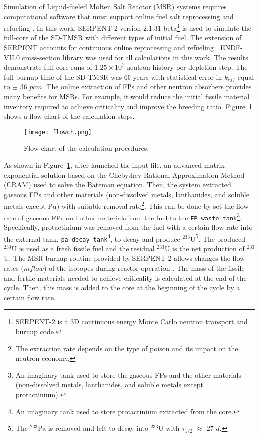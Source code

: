 Simulation of Liquid-fueled Molten Salt Reactor (MSR) systems requires 
computational software that must support online fuel salt reprocessing and 
refueling \cite{serp2014molten}. In this work, SERPENT-2 version 2.1.31 
beta\footnote{SERPENT-2 is a 3D continuous energy Monte Carlo neutron 
transport and burnup code.} \cite{leppanen2014serpent} is used to simulate the 
full-core of the SD-TMSR with different types of initial fuel. The extension 
of SERPENT accounts for continuous online reprocessing and refueling 
\cite{aufiero2013extended}. ENDF-VII.0 cross-section library was used for all 
calculations in this work. The results demonstrate full-core runs of 
$1.25\times 10^7$ neutron history per depletion step. The full burnup time of 
the SD-TMSR was 60 years with statistical error in $k_{eff}$ equal to $\pm$ 
$36$ $pcm$. The online extraction of \gls{FPs} and other neutron absorbers 
provides many benefits for MSRs. For example, it would reduce the initial 
fissile material inventory required to achieve criticality and improve the 
breeding ratio. Figure~\ref{fig:flow} shows a flow chart of the calculation 
steps. 

\begin{figure}[t!] %
	\texttt{[image: flowch.png]}
	\caption{Flow chart of the calculation procedures.}
	\label{fig:flow}
\end{figure}

As shown in Figure~\ref{fig:flow}, after launched the input file, an advanced 
matrix exponential solution based on the Chebyshev Rational Approximation 
Method (CRAM) \cite{isotalo2016improving} used to solve the Bateman equation. 
Then, the system extracted gaseous \gls{FPs} and other materials 
(non-dissolved metals, lanthanides, and soluble metals except Pu) with 
suitable removal rate\footnote{The extraction rate depends on the type of 
poison and its impact on the neutron
economy.}. This can be done by set the 
flow rate of gaseous \gls{FPs} and other materials from the fuel to the 
\texttt{FP-waste tank}\footnote{An imaginary tank used to store the gaseous 
\gls{FPs} and the other materials (non-dissolved metals, lanthanides, and 
soluble metals except protactinium).}. Specifically, protactinium was removed 
from the fuel with a certain flow rate into the external tank, 
\texttt{pa-decay tank}\footnote{An imaginary tank used to store protactinium 
extracted from the core.}, to decay and produce $^{233}$U\footnote{The 
$^{233}$Pa is removed and left to decay into $^{233}$U with $\tau_{1/2}$ 
$\approx$ $27$ $d$.}. The produced $^{233}$U is used as a fresh fissile fuel 
and the residual $^{233}$U is the net production of $^{233}$U. The MSR burnup 
routine provided by SERPENT-2 allows changes the flow rates ($mflow$) of the 
isotopes during reactor operation \cite{aufiero2013extended}. The mass of the 
fissile and fertile materials needed to achieve criticality is calculated at 
the end of the cycle. Then, this mass is added to the core at the beginning of 
the cycle by a certain flow rate.


